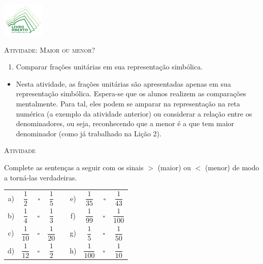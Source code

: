 \documentclass[10 pt,usenames,dvipsnames, oneside]{article}
\begin{document}
\begin{center}
  \begin{minipage}[l]{3cm}
\includegraphics[width=2cm]{../../../Figuras/logo}       
\end{minipage}\hfill
\begin{minipage}[r]{.8\textwidth}
 {\Large \scshape Atividade: Maior ou menor?}  
\end{minipage}
\end{center}
\vspace{.2cm}

\ifdefined\prof
\begin{goals}
\begin{enumerate}
\item Comparar frações unitárias em sua representação simbólica.
\end{enumerate}

\tcblower

\begin{itemize}
\item  Nesta atividade, as frações unitárias são apresentadas apenas em sua  representação simbólica. Espera-se que os alunos realizem as comparações mentalmente. Para tal, eles podem se amparar na representação na reta numérica (a exemplo da atividade anterior) ou considerar a relação entre os denominadores, ou seja, reconhecendo que a menor é a que tem maior denominador (como já trabalhado na Lição 2).
\end{itemize}
\end{goals}

\bigskip
\begin{center}
{\large \scshape Atividade}
\end{center}
\fi

Complete as sentenças a seguir com os sinais $>$ (maior) ou $<$ (menor) de modo a torná-las verdadeiras.
\begin{center}
\begin{tabular}{ccccccccc}
 a)  &   $\dfrac{1}{2}$    & \parbox[t][.6cm]{2cm}{ }\;\,{\huge $\square$} \quad      &  $\dfrac{1}{5}$ & \quad\quad\quad\quad\quad\quad\quad   &e)  &  $\dfrac{1}{35}$   & \,{\huge $\square$}\quad      &  $\dfrac{1}{43}$\\
 b)  &  $\dfrac{1}{4}$    & \parbox[t][.6cm]{2cm}{ }{\huge $\square$}      &  $\dfrac{1}{3}$   & & f)  &  $\dfrac{1}{99}$   &  {\huge $\square$}     &  $\dfrac{1}{100}$  \\
 c)  &  $\dfrac{1}{10}$   &  \parbox[t][.6cm]{2cm}{ }{\huge $\square$}     &  $\dfrac{1}{20}$  & & g)  &  $\dfrac{1}{5}$    &  {\huge $\square$}     &  $\dfrac{1}{50}$  \\
 d)  &  $\dfrac{1}{12}$   & \parbox[t][.6cm]{2cm}{ }{\huge $\square$}      &  $\dfrac{1}{2}$   & & h)  &  $\dfrac{1}{100}$  & {\huge $\square$}      &  $\dfrac{1}{10}$  \\
 \end{tabular}
 \end{center}
\end{document}
